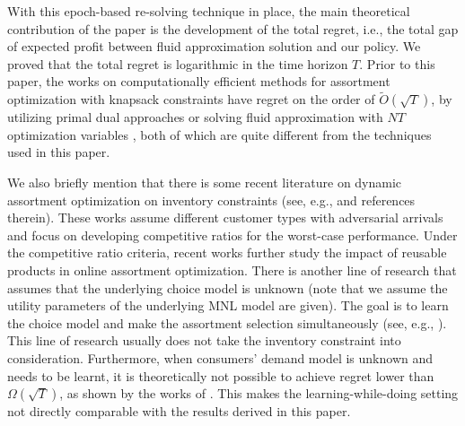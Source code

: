 \documentclass[opre]{informs3aa}
\newcommand{\Authornote}[2]{{\small\textcolor{DSgray}{\sf$<<<${  #1: #2
			}$>>>$}}}
\newcommand{\xnote}[1]{{\Authornote{Xi}{#1}}}
\begin{document}

With this epoch-based re-solving technique in place,  the main theoretical contribution of the paper is the development of the total regret, i.e., the total gap of expected profit between fluid approximation solution and our policy. 
 We proved that the total regret is logarithmic in the time horizon $T$.
 Prior to this paper, the works on computationally efficient methods for assortment optimization with knapsack constraints have regret on the order of $\widetilde O(\sqrt{T})$, by utilizing primal dual approaches \citep{jiang2020online,miao2021general} or solving fluid approximation with $NT$ optimization variables \citep{lei2018randomized}, both of which are quite different from the techniques used in this paper.

We also briefly mention that there is some recent literature on dynamic assortment optimization on inventory constraints (see, e.g., \citet{Golrezaei2014,Chen:16recom,Fata19mutli} and references therein).  These works assume different customer types with adversarial arrivals and focus on developing competitive ratios for the worst-case performance. Under the competitive ratio criteria, recent works \citep{Gong:19:online, Feng:20:near} further study the impact of reusable products in online assortment optimization. There is another line of research that assumes that the underlying choice model is unknown (note that we assume the utility parameters of the underlying MNL model are given). The goal is to learn the choice model and make the assortment selection simultaneously (see, e.g., \citet{rusmevichientong2010dynamic, Saure2013,agrawal2017thompson,Chen:18tight, agrawal2019mnl,Chen:20context,chen2021dynamic,chen2021optimal}). This line of research usually does not take the inventory constraint into consideration.
Furthermore, when consumers' demand model is unknown and needs to be learnt, it is theoretically not possible to achieve regret lower than $\Omega(\sqrt{T})$,
as shown by the works of \cite{agrawal2019mnl,Chen:18tight}.
This makes the learning-while-doing setting not directly comparable with the results derived in this paper. %
\end{document}
